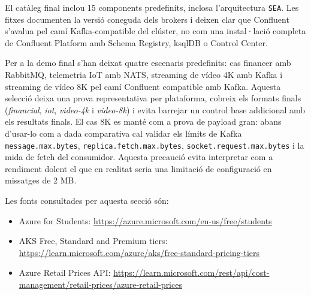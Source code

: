 El catàleg final inclou 15 components predefinits, inclosa l'arquitectura
\texttt{SEA}. Les fitxes documenten la versió coneguda dels brokers i deixen
clar que Confluent s'avalua pel camí Kafka-compatible del clúster, no com una
instal·lació completa de Confluent Platform amb Schema Registry, ksqlDB o
Control Center.

Per a la demo final s'han deixat quatre escenaris predefinits: cas financer
amb RabbitMQ, telemetria IoT amb NATS, streaming de vídeo 4K amb Kafka i
streaming de vídeo 8K pel camí Confluent compatible amb Kafka. Aquesta selecció
deixa una prova representativa per plataforma, cobreix els formats finals
(\emph{financial}, \emph{iot}, \emph{video-4k} i \emph{video-8k}) i evita
barrejar un control base addicional amb els resultats finals. El cas 8K es
manté com a prova de payload gran: abans d'usar-lo com a dada comparativa cal
validar els límits de Kafka \texttt{message.max.bytes},
\texttt{replica.fetch.max.bytes}, \texttt{socket.request.max.bytes} i la mida
de fetch del consumidor. Aquesta precaució evita interpretar com a rendiment
dolent el que en realitat seria una limitació de configuració en missatges de
2 MB.

Les fonts consultades per aquesta secció són:
\begin{itemize}
  \item Azure for Students: \url{https://azure.microsoft.com/en-us/free/students}
  \item AKS Free, Standard and Premium tiers:
        \url{https://learn.microsoft.com/azure/aks/free-standard-pricing-tiers}
  \item Azure Retail Prices API:
        \url{https://learn.microsoft.com/rest/api/cost-management/retail-prices/azure-retail-prices}
\end{itemize}
